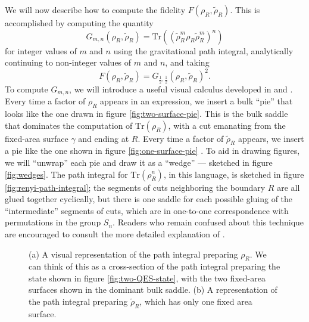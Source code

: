 \documentclass[a4paper,11pt]{article}
\renewcommand{\tr}{\text{Tr}}
\renewcommand{\tilde}{\widetilde}
\begin{document}
We will now describe how to compute the fidelity $F(\rho_{R}, \tilde{\rho}_{R}).$ This is accomplished by computing the quantity
\begin{equation} \label{eq:G-definition}
    G_{m, n}(\rho_{R}, \tilde{\rho}_{R}) = \tr((\tilde{\rho}_{R}^m \rho_{R} \tilde{\rho}_{R}^m)^n)
\end{equation}
for integer values of $m$ and $n$ using the gravitational path integral, analytically continuing to non-integer values of $m$ and $n$, and taking
\begin{equation} \label{eq:fidelity-G}
    F(\rho_R, \tilde{\rho}_R) = G_{\frac{1}{2}, \frac{1}{2}}(\rho_{R}, \tilde{\rho}_{R})^2.
\end{equation}
To compute $G_{m,n}$, we will introduce a useful visual calculus developed in \cite{competing-saddles-2} and \cite{akers-penington}. Every time a factor of $\rho_R$ appears in an expression, we insert a bulk ``pie'' that looks like the one drawn in figure \ref{fig:two-surface-pie}. This is the bulk saddle that dominates the computation of $\tr(\rho_{R})$, with a cut emanating from the fixed-area surface $\gamma$ and ending at $R$. Every time a factor of $\tilde{\rho}_{R}$ appears, we insert a pie like the one shown in figure \ref{fig:one-surface-pie} . To aid in drawing figures, we will ``unwrap'' each pie and draw it as a ``wedge'' --- sketched in figure \ref{fig:wedges}. The path integral for $\tr(\rho_R^n)$, in this language, is sketched in figure \ref{fig:renyi-path-integral}; the segments of cuts neighboring the boundary $R$ are all glued together cyclically, but there is one saddle for each possible gluing of the ``intermediate'' segments of cuts, which are in one-to-one correspondence with permutations in the group $S_n$. Readers who remain confused about this technique are encouraged to consult the more detailed explanation of \cite{akers-penington}.

\begin{figure}
    \centering
    \caption{(a) A visual representation of the path integral preparing $\rho_{R}$. We can think of this as a cross-section of the path integral preparing the state shown in figure \ref{fig:two-QES-state}, with the two fixed-area surfaces shown in the dominant bulk saddle. (b) A representation of the path integral preparing $\tilde{\rho}_{R}$, which has only one fixed area surface.}
    \label{fig:pies}
\end{figure}
\end{document}
